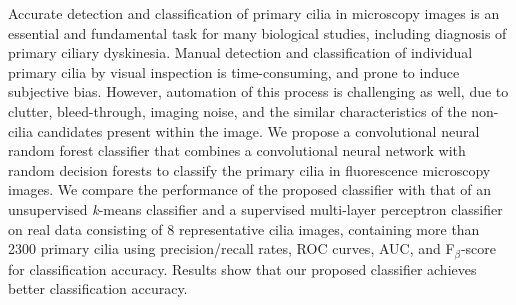 Accurate detection and classification of primary cilia in microscopy images is an essential and fundamental task for many biological studies, including diagnosis of primary ciliary dyskinesia. Manual detection and classification of individual primary cilia by visual inspection is time-consuming, and prone to induce subjective bias. However, automation of this process is challenging as well, due to clutter, bleed-through, imaging noise, and the similar characteristics of the non-cilia candidates present within the image. We propose a convolutional neural random forest classifier that combines a convolutional neural network with random decision forests to classify the primary cilia in fluorescence microscopy images. We compare the performance of the proposed classifier with that of an unsupervised \emph{k}-means classifier and a supervised multi-layer perceptron classifier on real data consisting of 8 representative cilia images, containing more than 2300 primary cilia using precision/recall rates, ROC curves, AUC, and F$_{\beta}$-score for classification accuracy. Results show that our proposed classifier achieves better classification accuracy.
